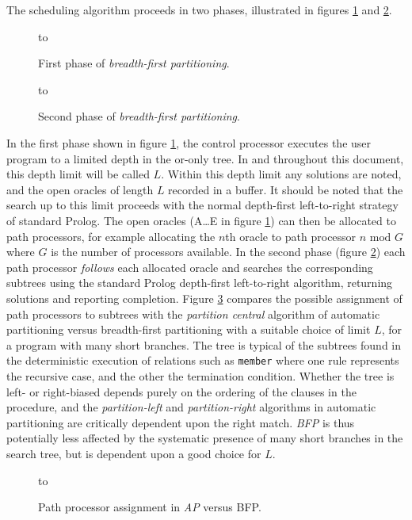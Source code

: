 \begin{itemize}
{  The scheduling algorithm proceeds in two phases, illustrated in figures \ref{bfp_phase1}
  and \ref{bfp_phase2}.
\begin{figure}[h]
\vspace{5mm} \hbox to 
\caption{First phase of \textit{breadth-first partitioning}.}
\vspace{5mm}
\label{bfp_phase1}
\end{figure}
\begin{figure}[h]
\vspace{5mm} \hbox to 
\caption{Second phase of \textit{breadth-first partitioning}.}
\vspace{5mm}
\label{bfp_phase2}
\end{figure}
  In the first phase shown in figure \ref{bfp_phase1}, 
  the control processor executes the user program to a limited
  depth in the or-only tree.  In \cite{Sar95} and throughout this document, this
  depth limit will be called $L$.  Within this depth limit any solutions are noted,
  and the open oracles of length $L$ recorded in a buffer.  It should be noted that
  the search up to this limit proceeds with the normal depth-first left-to-right
  strategy of standard Prolog.  The open oracles (A\ldots E in figure \ref{bfp_phase1})
  can then be allocated to path processors, for example allocating the $n$th oracle
  to path processor $n \mbox{ mod } G$ where $G$ is the number of processors available.
  In the second phase (figure \ref{bfp_phase2})
  each path processor \textit{follows} each allocated oracle and searches the
  corresponding subtrees using the standard Prolog depth-first left-to-right algorithm,
  returning solutions and reporting completion.  Figure \ref{bfp_vs_ap} compares the
  possible assignment of path processors to subtrees with the \textit{partition central}
  algorithm of automatic partitioning versus breadth-first partitioning with a suitable
  choice of limit $L$, for a program with many short branches.  The tree is typical of
  the subtrees found in the deterministic execution of relations such as \texttt{member}
  where one rule represents the recursive case, and the other the termination condition.
  Whether the tree is left- or right-biased depends purely on the ordering of
  the clauses in the procedure, and the \textit{partition-left} and \textit{partition-right}
  algorithms in automatic partitioning are critically dependent upon the right match.
  \textit{BFP} is thus potentially less affected by the systematic presence of many short
  branches in the search tree, but is dependent upon a good choice for $L$.
\begin{figure}[h]
\vspace{5mm} \hbox to 
\caption{Path processor assignment in \textit{AP} versus {BFP}.}
\vspace{5mm}
\label{bfp_vs_ap}
\end{figure}

}
\end{itemize}
